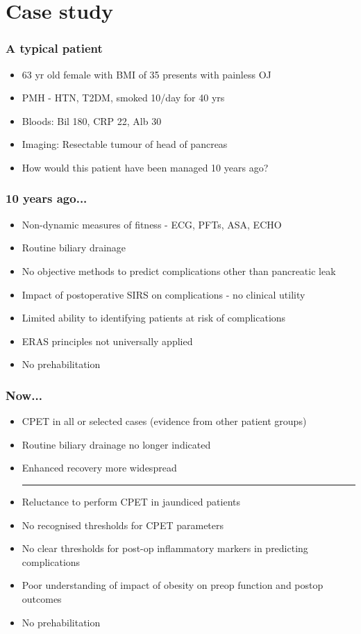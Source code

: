 \documentclass[10pt]{beamer}
\begin{document}
\section{Case study}
\begin{frame}
	\frametitle{A typical patient}
	\begin{itemize}
		\item 63 yr old female with BMI of 35 presents with painless OJ
		\item PMH - HTN, T2DM, smoked 10/day for 40 yrs
		\item Bloods: Bil 180, CRP 22, Alb 30
		\item Imaging: Resectable tumour of head of pancreas
		\item How would this patient have been managed 10 years ago?
	\end{itemize}
\end{frame}

\begin{frame}
	\frametitle{10 years ago...}
	\begin{itemize}
		\item Non-dynamic measures of fitness - ECG, PFTs, ASA, ECHO
		\item Routine biliary drainage
		\item No objective methods to predict complications other than pancreatic leak
		\item Impact of postoperative SIRS on complications - no clinical utility
		\item Limited ability to identifying patients at risk of complications
		\item ERAS principles not universally applied
		\item No prehabilitation
	\end{itemize}
\end{frame}

\begin{frame}
	\frametitle{Now... }
	\begin{itemize}
		\item CPET in all or selected cases (evidence from other patient groups)
		\item Routine biliary drainage no longer indicated
		\item Enhanced recovery more widespread
		\medskip
		\hrule
		\medskip
		\item Reluctance to perform CPET in jaundiced patients
		\item No recognised thresholds for CPET parameters
		\item No clear thresholds for post-op inflammatory markers in predicting complications
		\item Poor understanding of impact of obesity on preop function and postop outcomes
		\item No prehabilitation
	\end{itemize}
\end{frame}
\end{document}
